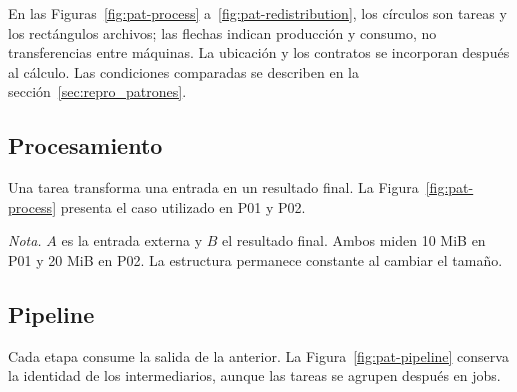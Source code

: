 En las Figuras~\ref{fig:pat-process} a~\ref{fig:pat-redistribution}, los círculos son tareas y los rectángulos archivos; las flechas indican producción y consumo, no transferencias entre máquinas. La ubicación y los contratos se incorporan después al cálculo. Las condiciones comparadas se describen en la sección~\ref{sec:repro_patrones}.

\subsection{Procesamiento}
Una tarea transforma una entrada en un resultado final. La Figura~\ref{fig:pat-process} presenta el caso utilizado en P01 y P02.

\par\medskip\noindent\begin{minipage}{\linewidth}
\captionsetup{type=figure}
\caption{Patrón de procesamiento}
\label{fig:pat-process}
\centering
\begin{lrbox}{\dmediagrambox}\end{lrbox}\fitdmediagram
\par\smallskip\raggedright\normalsize\textit{Nota.} $A$ es la entrada externa y $B$ el resultado final. Ambos miden 10 MiB en P01 y 20 MiB en P02. La estructura permanece constante al cambiar el tamaño.
\end{minipage}\par\medskip

\subsection{Pipeline}
Cada etapa consume la salida de la anterior. La Figura~\ref{fig:pat-pipeline} conserva la identidad de los intermediarios, aunque las tareas se agrupen después en jobs.

